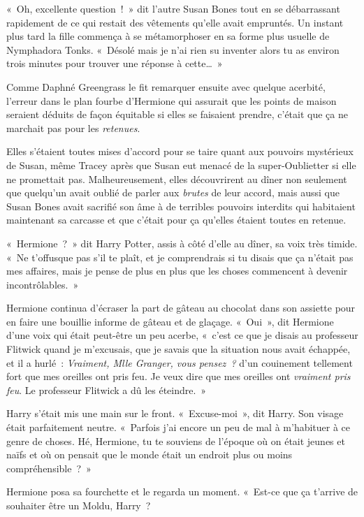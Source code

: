 «~Oh, excellente question~!~» dit l'autre Susan Bones tout en se débarrassant rapidement de ce qui restait des vêtements qu'elle avait empruntés. Un instant plus tard la fille commença à se métamorphoser en sa forme plus usuelle de Nymphadora Tonks. «~Désolé mais je n'ai rien su inventer alors tu as environ trois minutes pour trouver une réponse à cette…~»

\later

Comme Daphné Greengrass le fit remarquer ensuite avec quelque acerbité, l'erreur dans le plan fourbe d'Hermione qui assurait que les points de maison seraient déduits de façon équitable si elles se faisaient prendre, c'était que ça ne marchait pas pour les \emph{retenues}.

Elles s'étaient toutes mises d'accord pour se taire quant aux pouvoirs mystérieux de Susan, même Tracey après que Susan eut menacé de la super-Oublietter si elle ne promettait pas. Malheureusement, elles découvrirent au dîner non seulement que quelqu'un avait oublié de parler aux \emph{brutes} de leur accord, mais aussi que Susan Bones avait sacrifié son âme à de terribles pouvoirs interdits qui habitaient maintenant sa carcasse et que c'était pour ça qu'elles étaient toutes en retenue.

«~Hermione~?~» dit Harry Potter, assis à côté d'elle au dîner, sa voix très timide. «~Ne t'offusque pas s'il te plaît, et je comprendrais si tu disais que ça n'était pas mes affaires, mais je pense de plus en plus que les choses commencent à devenir incontrôlables.~»

Hermione continua d'écraser la part de gâteau au chocolat dans son assiette pour en faire une bouillie informe de gâteau et de glaçage. «~Oui~», dit Hermione d'une voix qui était peut-être un peu acerbe, «~c'est ce que je disais au professeur Flitwick quand je m'excusais, que je savais que la situation nous avait échappée, et il a hurlé~: \emph{Vraiment, Mlle Granger, vous pensez~?} d'un couinement tellement fort que mes oreilles ont pris feu. Je veux dire que mes oreilles ont \emph{vraiment pris feu}. Le professeur Flitwick a dû les éteindre.~»

Harry s'était mis une main sur le front. «~Excuse-moi~», dit Harry. Son visage était parfaitement neutre. «~Parfois j'ai encore un peu de mal à m'habituer à ce genre de choses. Hé, Hermione, tu te souviens de l'époque où on était jeunes et naïfs et où on pensait que le monde était un endroit plus ou moins compréhensible~?~»

Hermione posa sa fourchette et le regarda un moment. «~Est-ce que ça t'arrive de souhaiter être un Moldu, Harry~?

